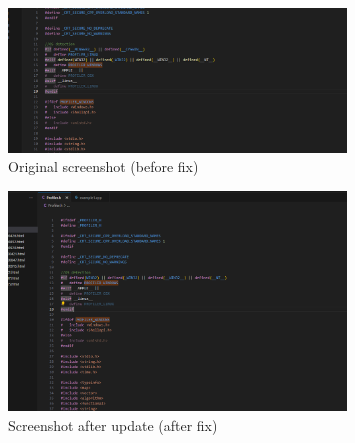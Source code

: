 \documentclass[../ro-fa-lab.tex]{subfiles}
\begin{document}
\begin{figure}[htbp]
    \centering
    \includegraphics[width=0.8\textwidth]{./Resources/error_fix/image2.png}
    \caption{Original screenshot (before fix)}
    \label{fig:error2}
\end{figure}

\begin{figure}[htbp]
    \centering
    \includegraphics[width=0.8\textwidth]{./Resources/error_fix/image3.png}
    \caption{Screenshot after update (after fix)}
    \label{fig:error3}
\end{figure}
\end{document}
